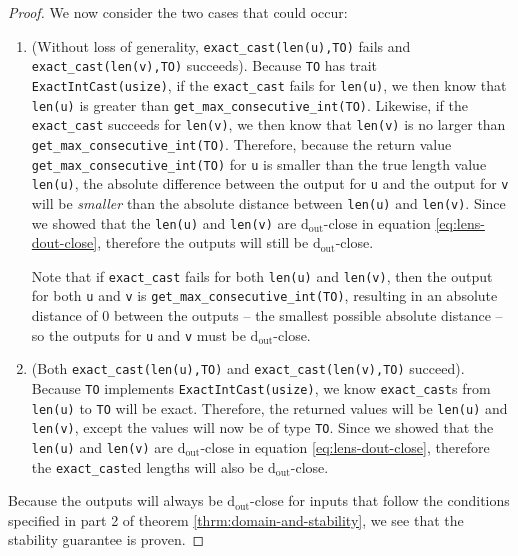 \documentclass[12pt,letterpaper]{article}
\newcommand{\dout}{\mathrm{d_{out}}}
\theoremstyle{definition}
\begin{document}
\begin{proof}
We now consider the two cases that could occur:

\begin{enumerate}
    \item (Without loss of generality, \texttt{exact\_cast(len(u),TO)} fails and \texttt{exact\_cast(len(v),TO)} succeeds). Because \texttt{TO} has trait \texttt{ExactIntCast(usize)}, if the \texttt{exact\_cast} fails for \texttt{len(u)}, we then know that \texttt{len(u)} is greater than \texttt{get\_max\_consecutive\_int(TO)}. Likewise, if the \texttt{exact\_cast} succeeds for \texttt{len(v)}, we then know that \texttt{len(v)} is no larger than \texttt{get\_max\_consecutive\_int(TO)}. Therefore, because the return value  \texttt{get\_max\_consecutive\_int(TO)} for \texttt{u} is smaller than the true length value \texttt{len(u)}, the absolute difference between the output for \texttt{u} and the output for \texttt{v} will be \emph{smaller} than the absolute distance between \texttt{len(u)} and \texttt{len(v)}. Since we showed that the \texttt{len(u)} and \texttt{len(v)} are $\dout$-close in equation \ref{eq:lens-dout-close}, therefore the outputs will still be $\dout$-close.
    
    Note that if \texttt{exact\_cast} fails for both \texttt{len(u)} and \texttt{len(v)}, then the output for both \texttt{u} and \texttt{v} is \texttt{get\_max\_consecutive\_int(TO)}, resulting in an absolute distance of 0 between the outputs -- the smallest possible absolute distance -- so the outputs for \texttt{u} and \texttt{v} must be $\dout$-close.
    
    \item (Both \texttt{exact\_cast(len(u),TO)} and \texttt{exact\_cast(len(v),TO)} succeed). Because \texttt{TO} implements \texttt{ExactIntCast(usize)}, we know \texttt{exact\_cast}s from \texttt{len(u)} to \texttt{TO} will be exact. Therefore, the returned values will be \texttt{len(u)} and \texttt{len(v)}, except the values will now be of type \texttt{TO}. Since we showed that the \texttt{len(u)} and \texttt{len(v)} are $\dout$-close in equation \ref{eq:lens-dout-close}, therefore the \texttt{exact\_cast}ed lengths will also be $\dout$-close.
\end{enumerate}

Because the outputs will always be $\dout$-close for inputs that follow the conditions specified in part 2 of theorem \ref{thrm:domain-and-stability}, we see that the stability guarantee is proven.

\end{proof}
\end{document}
